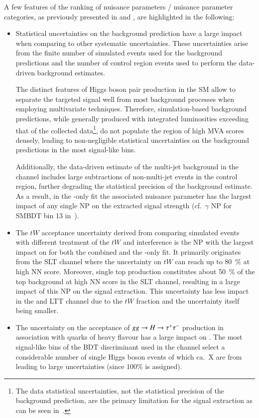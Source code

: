 A few features of the ranking of nuisance parameters / nuisance
parameter categories, as previously presented in
 and , are
highlighted in the following:
\begin{itemize}
\item Statistical uncertainties on the background prediction have a
  large impact when comparing to other systematic uncertainties. These
  uncertainties arise from the finite number of simulated events used
  for the background predictions and the number of control region
  events used to perform the data-driven \faketauhadvis background
  estimates.

  The distinct features of Higgs boson pair production in the SM allow
  to separate the targeted signal well from most background processes
  when employing multivariate techniques. Therefore, simulation-based
  background predictions, while generally produced with integrated
  luminosities exceeding that of the collected data\footnote{The data
    statistical uncertainties, not the statistical precision of the
    background prediction, are the primary limitation for the signal
    extraction as can be seen in~.}, do not
  populate the region of high MVA scores densely, leading to
  non-negligible statistical uncertainties on the background
  predictions in the most signal-like bins.

  Additionally, the data-driven estimate of the multi-jet background
  in the \hadhad channel includes large subtractions of non-multi-jet
  events in the control region, further degrading the statistical
  precision of the background estimate. As a result, in the
  \hadhad-only fit the associated nuisance parameter has the largest
  impact of any single NP on the extracted signal strength (cf.\
  $\gamma$ NP for SMBDT bin 13
  in~).

\item The $tW$ acceptance uncertainty derived from comparing simulated
  events with different treatment of the $tW$ and \ttbar interference
  is the NP with the largest impact on \muhat for both the combined
  and the \lephad-only fit. It primarily originates from the \lephad
  SLT channel where the uncertainty on $tW$ can reach up to
  \SI{80}{\percent} at high NN score. Moreover, single top production
  constitutes about \SI{50}{\percent} of the top background at high NN
  score in the \lephad SLT channel, resulting in a large impact of
  this NP on the signal extraction. This uncertainty has less impact
  in the \hadhad and \lephad LTT channel due to the $tW$ fraction and
  the uncertainty itself being smaller.

\item The uncertainty on the acceptance of $gg \to H \to \tau^{+} \tau^{-}$
  production in association with quarks of heavy flavour has a large
  impact on \muhat. The most signal-like bins of the BDT discriminant
  used in the \hadhad channel select a considerable number of single
  Higgs boson events of which ca.\ X are from \ggF leading to large
  uncertainties (since 100\% is assigned).
\end{itemize}

